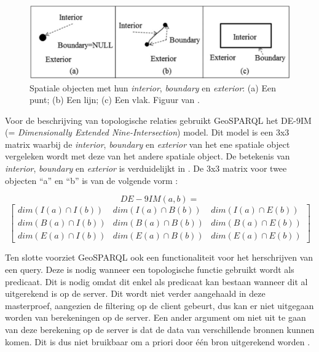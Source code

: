 \documentclass[twocolumn]{phdsymp} %
\begin{document}
\begin{figure}[ht]
    \centering
    \includegraphics[width=\linewidth]{images/spatial_objects_DE-9IM.png}
    \caption{Spatiale objecten met hun \textit{interior}, \textit{boundary} en \textit{exterior}: (a) Een punt; (b) Een lijn; (c) Een vlak. Figuur van \protect\cite{shen2018classification}.}
    \label{fig:abstr_de-9im}
\end{figure}

Voor de beschrijving van topologische relaties gebruikt GeoSPARQL het DE-9IM (= \textit{Dimensionally Extended Nine-Intersection}) model. Dit model is een 3x3 matrix waarbij de \textit{interior}, \textit{boundary} en \textit{exterior} van het ene spatiale object vergeleken wordt met deze van het andere spatiale object. De betekenis van \textit{interior}, \textit{boundary} en \textit{exterior} is verduidelijkt in . De 3x3 matrix voor twee objecten ``a'' en ``b'' is van de volgende vorm \cite{shen2018classification}:

\begin{equation*}
    DE-9IM(a,b) = 
\end{equation*}
\begin{equation*}
    \begin{bmatrix}
        dim(I(a)\cap I(b)) & dim(I(a)\cap B(b)) & dim(I(a)\cap E(b))\\
        dim(B(a)\cap I(b)) & dim(B(a)\cap B(b)) & dim(B(a)\cap E(b))\\
        dim(E(a)\cap I(b)) & dim(E(a)\cap B(b)) & dim(E(a)\cap E(b))
    \end{bmatrix}
\end{equation*}

Ten slotte voorziet GeoSPARQL ook een functionaliteit voor het herschrijven van een query. Deze is nodig wanneer een topologische functie gebruikt wordt als predicaat. Dit is nodig omdat dit enkel als predicaat kan bestaan wanneer dit al uitgerekend is op de server. Dit wordt niet verder aangehaald in deze masterproef, aangezien de filtering op de client gebeurt, dus kan er niet uitgegaan worden van berekeningen op de server. Een ander argument om niet uit te gaan van deze berekening op de server is dat de data van verschillende bronnen kunnen komen. Dit is dus niet bruikbaar om a priori door één bron uitgerekend worden \cite{ogcdocs}.
\end{document}
